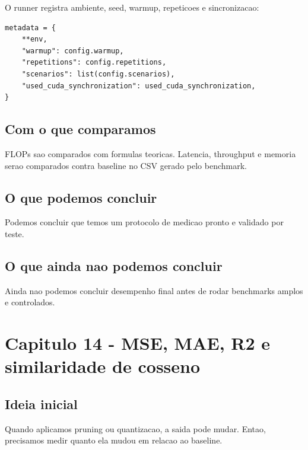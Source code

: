 O runner registra ambiente, seed, warmup, repeticoes e sincronizacao:



\begin{Verbatim}[fontsize=\small,breaklines=true,label=python]
metadata = {
    **env,
    "warmup": config.warmup,
    "repetitions": config.repetitions,
    "scenarios": list(config.scenarios),
    "used_cuda_synchronization": used_cuda_synchronization,
}
\end{Verbatim}



\subsection{Com o que comparamos}




FLOPs sao comparados com formulas teoricas. Latencia, throughput e memoria serao comparados contra baseline no CSV gerado pelo benchmark.



\subsection{O que podemos concluir}



Podemos concluir que temos um protocolo de medicao pronto e validado por teste.



\subsection{O que ainda nao podemos concluir}




Ainda nao podemos concluir desempenho final antes de rodar benchmarks amplos e controlados.



\section{Capitulo 14 - MSE, MAE, R2 e similaridade de cosseno}



\subsection{Ideia inicial}




Quando aplicamos pruning ou quantizacao, a saida pode mudar. Entao, precisamos medir quanto ela mudou em relacao ao baseline.




